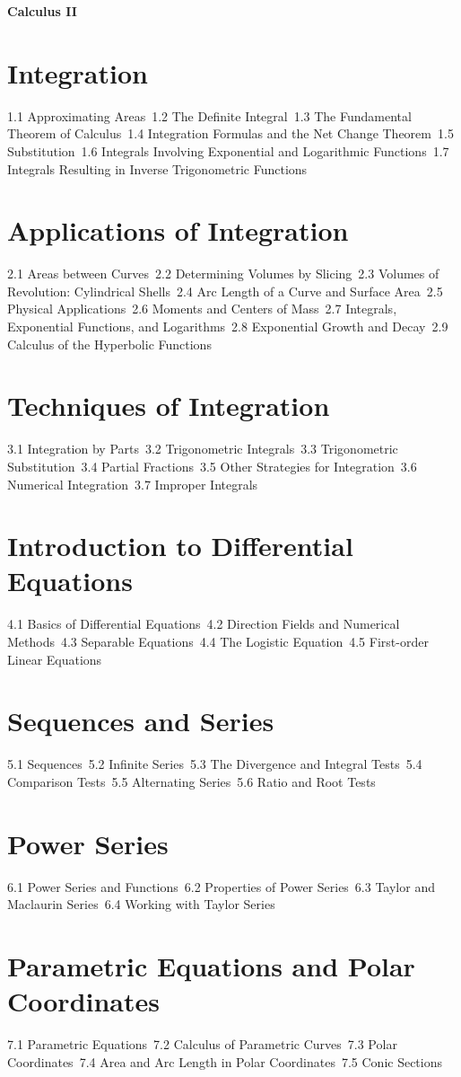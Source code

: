 {\LARGE \bf{Calculus II}}
\section{Integration}
1.1 Approximating Areas\
1.2 The Definite Integral\
1.3 The Fundamental Theorem of Calculus\
1.4 Integration Formulas and the Net Change Theorem\
1.5 Substitution\
1.6 Integrals Involving Exponential and Logarithmic Functions\
1.7 Integrals Resulting in Inverse Trigonometric Functions\
\section{Applications of Integration}
2.1 Areas between Curves\
2.2 Determining Volumes by Slicing\
2.3 Volumes of Revolution: Cylindrical Shells\
2.4 Arc Length of a Curve and Surface Area\
2.5 Physical Applications\
2.6 Moments and Centers of Mass\
2.7 Integrals, Exponential Functions, and Logarithms\
2.8 Exponential Growth and Decay\
2.9 Calculus of the Hyperbolic Functions\
\section{Techniques of Integration}
3.1 Integration by Parts\
3.2 Trigonometric Integrals\
3.3 Trigonometric Substitution\
3.4 Partial Fractions\
3.5 Other Strategies for Integration\
3.6 Numerical Integration\
3.7 Improper Integrals\
\section{Introduction to Differential Equations}
4.1 Basics of Differential Equations\
4.2 Direction Fields and Numerical Methods\
4.3 Separable Equations\
4.4 The Logistic Equation\
4.5 First-order Linear Equations\
\section{Sequences and Series}
5.1 Sequences\
5.2 Infinite Series\
5.3 The Divergence and Integral Tests\
5.4 Comparison Tests\
5.5 Alternating Series\
5.6 Ratio and Root Tests\
\section{Power Series}
6.1 Power Series and Functions\
6.2 Properties of Power Series\
6.3 Taylor and Maclaurin Series\
6.4 Working with Taylor Series\
\section{Parametric Equations and Polar Coordinates}
7.1 Parametric Equations\
7.2 Calculus of Parametric Curves\
7.3 Polar Coordinates\
7.4 Area and Arc Length in Polar Coordinates\
7.5 Conic Sections\
